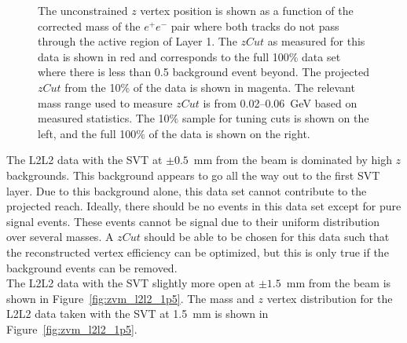 \begin{figure}[hbt]
  \caption[$z$ vertex and mass distribution for the L2L2 data set with the SVT at $\pm0.5$~mm]{The unconstrained $z$ vertex position is shown as a function of the corrected mass
of the $e^+e^-$ pair where both tracks do not pass through the active region of Layer 1. The $zCut$ as measured for this data is shown in red
and corresponds to the full 100$\%$ data set where there is less than 0.5 background event beyond. The projected $zCut$ from the 10$\%$ of the data is shown in magenta. The relevant mass range used to measure $zCut$ is from 0.02--0.06~GeV based on measured statistics. The 10$\%$ sample for tuning cuts is shown on the left, and the full 100$\%$ of the data is shown on the right.}
  \label{fig:zvm_l2l2}
\end{figure}
The L2L2 data with the SVT at $\pm0.5$~mm from the beam is dominated by high $z$ backgrounds. This background appears to go all the way out to the first SVT layer. Due to this background alone, this data set cannot contribute to the projected reach. Ideally, there should be no events in this data set except for pure signal events. These events cannot be signal due to their uniform distribution over several masses. A $zCut$ should be able to be chosen for this data such that the reconstructed vertex efficiency can be optimized, but this is only true if the background events can be removed. \\
\indent The L2L2 data with the SVT slightly more open at $\pm1.5$~mm from the beam is shown in Figure~\ref{fig:zvm_l2l2_1p5}. The mass and $z$ vertex distribution for the L2L2 data taken with the SVT at 1.5~mm is shown in Figure~\ref{fig:zvm_l2l2_1p5}.
